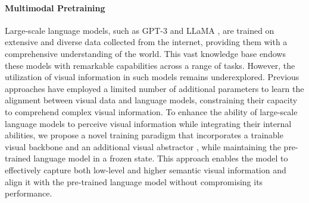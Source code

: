 \documentclass{article}
\begin{document}
\paragraph{Multimodal Pretraining}
Large-scale language models, such as GPT-3 \citep{gpt3} and LLaMA \citep{llama}, are trained on extensive and diverse data collected from the internet, providing them with a comprehensive understanding of the world. This vast knowledge base endows these models with remarkable capabilities across a range of tasks. However, the utilization of visual information in such models remains underexplored. Previous approaches \citep{minigpt4, llava} have employed a limited number of additional parameters to learn the alignment between visual data and language models, constraining their capacity to comprehend complex visual information. To enhance the ability of large-scale language models to perceive visual information while integrating their internal abilities, we propose a novel training paradigm that incorporates a trainable visual backbone  and an additional visual abstractor , while maintaining the pre-trained language model  in a frozen state. This approach enables the model to effectively capture both low-level and higher semantic visual information and align it with the pre-trained language model without compromising its performance.
\end{document}
